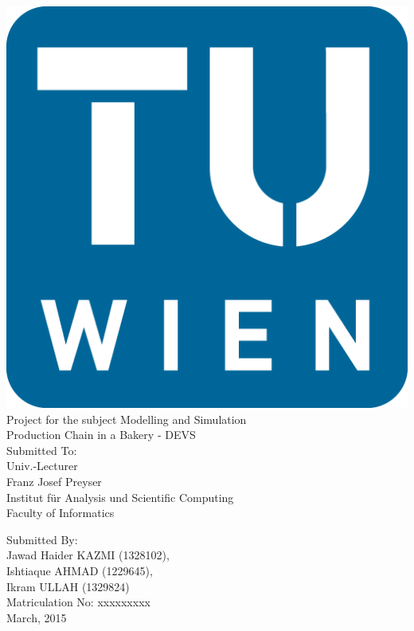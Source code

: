 \documentclass[titlepage]{article}%
\begin{document}
\pagestyle{empty}
\begin{center}
\includegraphics[scale=0.3]{TU-Signet.png}
\vspace{1cm}
{\Large \\Project for the subject Modelling and Simulation\\}
\vspace{1cm} 
{\huge Production Chain in a Bakery - DEVS\\}	%
\vspace{5cm}
{Submitted To:\\}
\vspace{0.3cm}
{Univ.-Lecturer\\}
{Franz Josef Preyser\\}
{Institut für Analysis und Scientific Computing\\}
{Faculty of Informatics\\}

\vspace{2cm}
{Submitted By:\\}
\vspace{0.3cm}
{Jawad Haider KAZMI (1328102), \\ Ishtiaque AHMAD (1229645), \\ Ikram ULLAH (1329824) \\}						%
{Matriculation No: xxxxxxxxx\\} 	%
\vspace{3cm}
March, 2015
\end{center}
\end{document}
